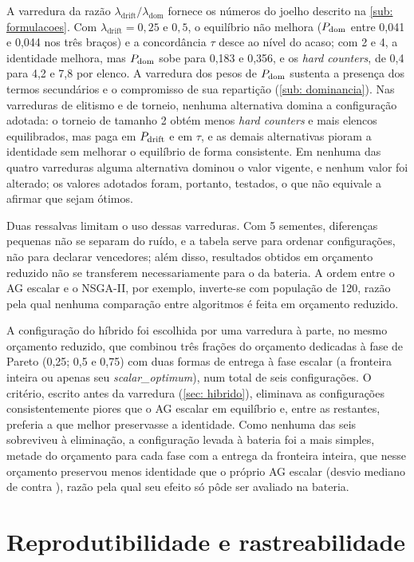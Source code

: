 A varredura da razão $\lambda_{\mathrm{drift}}/\lambda_{\mathrm{dom}}$ fornece os números do joelho descrito na \autoref{sub: formulacoes}. Com $\lambda_{\mathrm{drift}} = 0{,}25$ e $0{,}5$, o equilíbrio não melhora ($P_{\mathrm{dom}}$ entre 0,041 e 0,044 nos três braços) e a concordância $\tau$ desce ao nível do acaso; com 2 e 4, a identidade melhora, mas $P_{\mathrm{dom}}$ sobe para 0,183 e 0,356, e os \textit{hard counters}, de 0,4 para 4,2 e 7,8 por elenco. A varredura dos pesos de $P_{\mathrm{dom}}$ sustenta a presença dos termos secundários e o compromisso de sua repartição (\autoref{sub: dominancia}). Nas varreduras de elitismo e de torneio, nenhuma alternativa domina a configuração adotada: o torneio de tamanho 2 obtém menos \textit{hard counters} e mais elencos equilibrados, mas paga em $P_{\mathrm{drift}}$ e em $\tau$, e as demais alternativas pioram a identidade sem melhorar o equilíbrio de forma consistente. Em nenhuma das quatro varreduras alguma alternativa dominou o valor vigente, e nenhum valor foi alterado; os valores adotados foram, portanto, testados, o que não equivale a afirmar que sejam ótimos.

Duas ressalvas limitam o uso dessas varreduras. Com 5 sementes, diferenças pequenas não se separam do ruído, e a tabela serve para ordenar configurações, não para declarar vencedores; além disso, resultados obtidos em orçamento reduzido não se transferem necessariamente para o da bateria. A ordem entre o AG escalar e o NSGA-II, por exemplo, inverte-se com população de 120, razão pela qual nenhuma comparação entre algoritmos é feita em orçamento reduzido.

A configuração do híbrido foi escolhida por uma varredura à parte, no mesmo orçamento reduzido, que combinou três frações do orçamento dedicadas à fase de Pareto (0,25; 0,5 e 0,75) com duas formas de entrega à fase escalar (a fronteira inteira ou apenas seu \textit{scalar\_optimum}), num total de seis configurações. O critério, escrito antes da varredura (\autoref{sec: hibrido}), eliminava as configurações consistentemente piores que o AG escalar em equilíbrio e, entre as restantes, preferia a que melhor preservasse a identidade. Como nenhuma das seis sobreviveu à eliminação, a configuração levada à bateria foi a mais simples, metade do orçamento para cada fase com a entrega da fronteira inteira, que nesse orçamento preservou menos identidade que o próprio AG escalar (desvio mediano de \hibReduzidoDrift{} contra \agReduzidoDrift{}), razão pela qual seu efeito só pôde ser avaliado na bateria.

\section{Reprodutibilidade e rastreabilidade}
\label{sec: reprodutibilidade}

